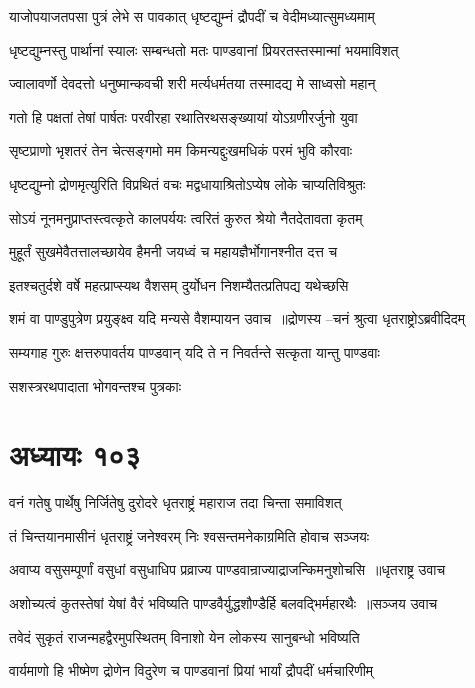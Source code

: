 \twolineshloka
{याजोपयाजतपसा पुत्रं लेभे स पावकात्}
{धृष्टद्युम्नं द्रौपदीं च वेदीमध्यात्सुमध्यमाम्}


\twolineshloka
{धृष्टद्युम्नस्तु पार्थानां स्यालः सम्बन्धतो मतः}
{पाण्डवानां प्रियरतस्तस्मान्मां भयमाविशत्}


\twolineshloka
{ज्वालावर्णो देवदत्तो धनुष्मान्कवची शरी}
{मर्त्यधर्मतया तस्मादद्य मे साध्वसो महान्}


\twolineshloka
{गतो हि पक्षतां तेषां पार्षतः परवीरहा}
{रथातिरथसङ्ख्यायां योऽग्रणीरर्जुनो युवा}


\twolineshloka
{सृष्टप्राणो भृशतरं तेन चेत्सङ्गमो मम}
{किमन्यद्दुःखमधिकं परमं भुवि कौरवाः}


\twolineshloka
{धृष्टद्युम्नो द्रोणमृत्युरिति विप्रथितं वचः}
{मद्वधायाश्रितोऽप्येष लोके चाप्यतिविश्रुतः}


\twolineshloka
{सोऽयं नूनमनुप्राप्तस्त्वत्कृते कालपर्ययः}
{त्वरितं कुरुत श्रेयो नैतदेतावता कृतम्}


\twolineshloka
{मुहूर्तं सुखमेवैतत्तालच्छायेव हैमनी}
{जयध्वं च महायज्ञैर्भोगानश्नीत दत्त च}


\twolineshloka
{इतश्चतुर्दशे वर्षे महत्प्राप्स्यथ वैशसम्}
{दुर्योधन निशम्यैतत्प्रतिपद्य यथेच्छसि}


\twolineshloka
{शमं वा पाण्डुपुत्रेण प्रयुङ्क्ष्व यदि मन्यसे}
{वैशम्पायन उवाच ॥द्रोणस्य --चनं श्रुत्वा धृतराष्ट्रोऽब्रवीदिदम्}


\threelineshloka
{सम्यगाह गुरुः क्षत्तरुपावर्तय पाण्डवान्}
{यदि ते न निवर्तन्ते सत्कृता यान्तु पाण्डवाः}
{}


सशस्त्ररथपादाता भोगवन्तश्च पुत्रकाः
\chapter{अध्यायः १०३}
\twolineshloka
{वनं गतेषु पार्थेषु निर्जितेषु दुरोदरे}
{धृतराष्ट्रं महाराज तदा चिन्ता समाविशत्}


\twolineshloka
{तं चिन्तयानमासीनं धृतराष्ट्रं जनेश्वरम्}
{निः श्वसन्तमनेकाग्रमिति होवाच सञ्जयः}


\twolineshloka
{अवाप्य वसुसम्पूर्णां वसुधां वसुधाधिप}
{प्रव्राज्य पाण्डवान्राज्याद्राजन्किमनुशोचसि ॥धृतराष्ट्र उवाच}


\twolineshloka
{अशोच्यत्वं कुतस्तेषां येषां वैरं भविष्यति}
{पाण्डवैर्युद्धशौण्डैर्हि बलवद्भिर्महारथैः ॥सञ्जय उवाच}


\twolineshloka
{तवेदं सुकृतं राजन्महद्वैरमुपस्थितम्}
{विनाशो येन लोकस्य सानुबन्धो भविष्यति}


\threelineshloka
{वार्यमाणो हि भीष्मेण द्रोणेन विदुरेण च}
{पाण्डवानां प्रियां भार्यां द्रौपदीं धर्मचारिणीम्}
{}


